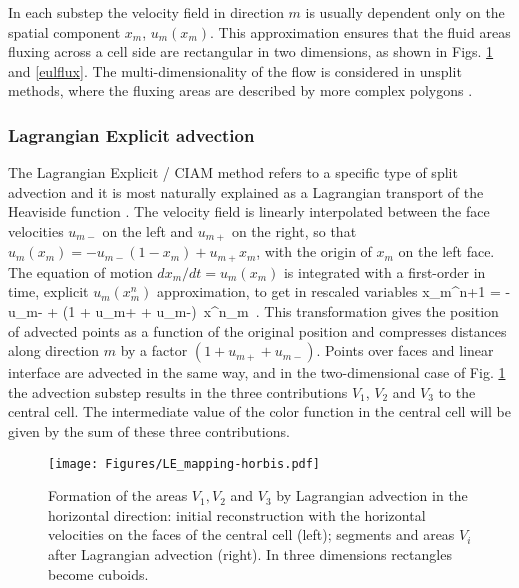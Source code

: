 In each substep the velocity field in direction $m$ is usually dependent
only on the spatial component $x_m$, $u_m (x_m)$. This approximation ensures that the 
fluid areas fluxing across a cell side are rectangular in two dimensions, as shown in
Figs. \ref{lagfig} and \ref{eulflux}. The multi-dimensionality of the flow
is considered in unsplit methods, where the fluxing areas are described by more 
complex polygons \cite{Cervone09}.

\subsubsection{Lagrangian Explicit advection}

The Lagrangian Explicit / CIAM method refers to a specific type
of split advection and it is most naturally explained
as a Lagrangian transport of the Heaviside function \cite{li95,Scardovelli02} . 
The velocity field is linearly interpolated between the face velocities $u_{m-}$ on
the left and $u_{m+}$ on the right, so that 
$u_m (x_m) = - u_{m-}( 1 - x_m) + u_{m+} x_m$, with the origin of
$x_m$ on the left face. 
The equation of motion $d x_m / dt = u_m (x_m)$ is integrated with a
first-order in time, explicit $u_m (x^n_m)$ approximation, to get in rescaled variables 
\be
x_m^{n+1} =  - u_{m-} +  (1 +  u_{m+} + u_{m-}) \,x^n_m \,.
\label{map}
\nd
This transformation gives the position of advected points as a function of the 
original position and compresses distances along direction $m$ by a factor 
$(1 + u_{m+} +  u_{m-})$. Points over faces and linear interface are advected
in the same way, and 
in the two-dimensional case of Fig. \ref{lagfig} the advection substep results 
in the three contributions $V_1$, $V_2$ and $V_3$ to the central cell.
The intermediate value of the color function in the central cell
will be given by the sum of these three contributions.
\begin{figure}
\begin{center}
    \texttt{[image: Figures/LE\_mapping-horbis.pdf]}
\end{center}
\caption{Formation of the areas  $V_1,V_2$ and $V_3$ by Lagrangian advection in the 
horizontal direction: initial reconstruction with the horizontal velocities on the faces 
of the central cell (left); segments and areas $V_i$ after Lagrangian 
advection (right). In three dimensions rectangles become cuboids.}
\label{lagfig}
\end{figure}

